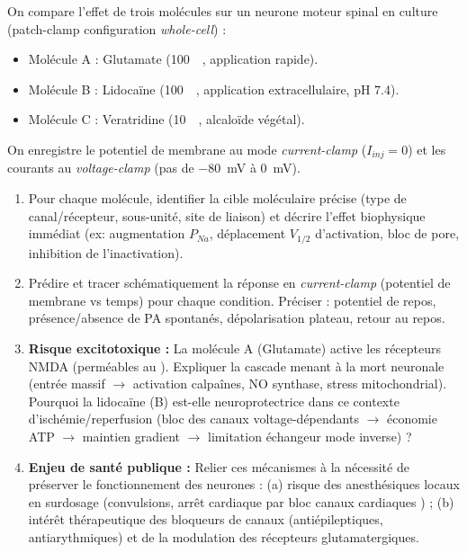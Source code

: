 \documentclass[11pt]{article}
\begin{document}
\begin{exercice}
On compare l'effet de trois molécules sur un neurone moteur spinal en culture (patch-clamp configuration \textit{whole-cell}) :
\begin{itemize}
    \item Molécule A : Glutamate (\SI{100}{\micro\molar}, application rapide).
    \item Molécule B : Lidocaïne (\SI{100}{\micro\molar}, application extracellulaire, pH 7.4).
    \item Molécule C : Veratridine (\SI{10}{\micro\molar}, alcaloïde végétal).
\end{itemize}
On enregistre le potentiel de membrane au mode \textit{current-clamp} ($I_{inj} = 0$) et les courants au \textit{voltage-clamp} (pas de \SI{-80}{\milli\volt} à \SI{0}{\milli\volt}).

\begin{enumerate}
    \item Pour chaque molécule, identifier la cible moléculaire précise (type de canal/récepteur, sous-unité, site de liaison) et décrire l'effet biophysique immédiat (ex: augmentation $P_{Na}$, déplacement $V_{1/2}$ d'activation, bloc de pore, inhibition de l'inactivation).
    \item Prédire et tracer schématiquement la réponse en \textit{current-clamp} (potentiel de membrane vs temps) pour chaque condition. Préciser : potentiel de repos, présence/absence de PA spontanés, dépolarisation plateau, retour au repos.
    \item \textbf{Risque excitotoxique :} La molécule A (Glutamate) active les récepteurs NMDA (perméables au ). Expliquer la cascade menant à la mort neuronale (entrée  massif $\rightarrow$ activation calpaînes, NO synthase, stress mitochondrial). Pourquoi la lidocaïne (B) est-elle neuroprotectrice dans ce contexte d'ischémie/reperfusion (bloc des canaux  voltage-dépendants $\rightarrow$ économie ATP $\rightarrow$ maintien gradient  $\rightarrow$ limitation échangeur  mode inverse) ?
    \item \textbf{Enjeu de santé publique :} Relier ces mécanismes à la nécessité de préserver le fonctionnement des neurones : (a) risque des anesthésiques locaux en surdosage (convulsions, arrêt cardiaque par bloc canaux  cardiaques ) ; (b) intérêt thérapeutique des bloqueurs de canaux  (antiépileptiques, antiarythmiques) et de la modulation des récepteurs glutamatergiques.
\end{enumerate}
\end{exercice}
\end{document}
